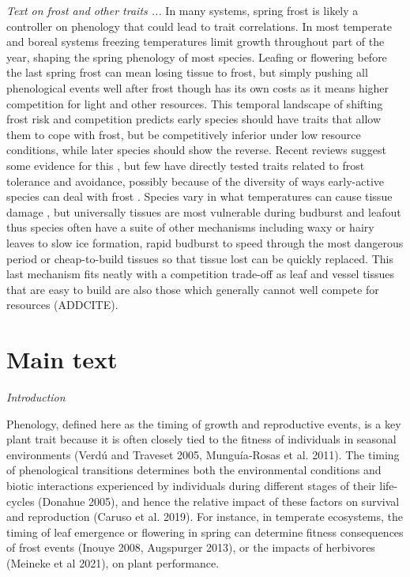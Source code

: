 \documentclass[11pt]{article}
\begin{document}
\emph{Text on frost and other traits ...} 
In many systems, spring frost is likely a controller on phenology that could lead to trait correlations. In most temperate and boreal systems freezing temperatures limit growth throughout part of the year, shaping the spring phenology of most species. Leafing or flowering before the last spring frost can mean losing tissue to frost, but simply pushing all phenological events well after frost though has its own costs as it means higher competition for light and other resources. This temporal landscape of shifting frost risk and competition predicts early species should have traits that allow them to cope with frost, but be competitively inferior under low resource conditions, while later species should show the reverse. Recent reviews suggest some evidence for this \citep{wolkovich2014aob,memegan2021}, but few have directly tested traits related to frost tolerance and avoidance, possibly because of the diversity of ways early-active species can deal with frost \citep{frostbook}. Species vary in what temperatures can cause tissue damage \citep{Lenz2013}, but universally tissues are most vulnerable during budburst and leafout \citep{frostbook,cat2019} thus species often have a suite of other mechanisms including waxy or hairy leaves to slow ice formation, rapid budburst to speed through the most dangerous period or cheap-to-build tissues so that tissue lost can be quickly replaced. This last mechanism fits neatly with a competition trade-off as leaf and vessel tissues that are easy to build are also those which generally cannot well compete for resources (ADDCITE). %

\section{Main text}

\emph{Introduction} 

Phenology, defined here as the timing of growth and reproductive events, is a key plant trait because it is often closely tied to the fitness of individuals in seasonal environments (Verdú and Traveset 2005, Munguía‐Rosas et al. 2011). The timing of phenological transitions determines both the environmental conditions and biotic interactions experienced by individuals during different stages of their life-cycles (Donahue 2005), and hence the relative impact of these factors on survival and reproduction (Caruso et al. 2019). For instance, in temperate ecosystems, the timing of leaf emergence or flowering in spring can determine fitness consequences of frost events (Inouye 2008, Augspurger 2013), or the impacts of herbivores (Meineke et al 2021), on plant performance.
\end{document}
